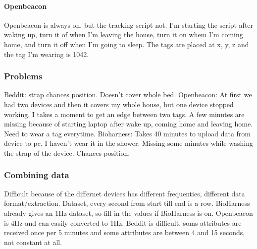 			\paragraph{Openbeacon}
				Openbeacon is always on, but the tracking script not. I'm starting the script after waking up, turn it of when I'm leaving the house, turn it on whem I'm coming home, and turn it off when I'm going to sleep. The tags are placed at x, y, z and the tag I'm wearing is 1042. 
		\subsubsection{Problems}
			Beddit: strap chances position. Doesn't cover whole bed. 
			Openbeacon: At first we had two devices and then it covers my whole house, but one device stopped working. I takes a moment to get an edge between two tags. A few minutes are missing because of starting laptop after wake up, coming home and leaving home. Need to wear a tag everytime. 
			Bioharness: Takes 40 minutes to upload data from device to pc, I haven't wear it in the shower. Missing some minutes while washing the strap of the device. Chances position. 
		\subsubsection{Combining data}
			Difficult because of the differnet devices has different frequenties, different data format/extraction. 
			Dataset, every second from start till end is a row. BioHarness already gives an 1Hz dataset, so fill in the values if BioHarness is on. 
			Openbeacon is 4Hz and can easily converted to 1Hz.
			Beddit is difficult, soms attributes are received once per 5 minutes and some attributes are between 4 and 15 seconds, not constant at all.
			
